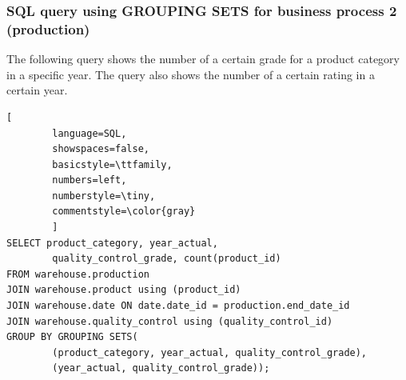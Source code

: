 \documentclass[letterpaper,12pt]{article}
\begin{document}
\subsubsection{SQL query using GROUPING SETS for business process 2 (production)}

The following query shows the number of a certain grade for a product category in a specific year. The query also shows the number of a certain rating in a certain year.

\begin{lstlisting}[
        language=SQL,
        showspaces=false,
        basicstyle=\ttfamily,
        numbers=left,
        numberstyle=\tiny,
        commentstyle=\color{gray}
        ]
SELECT product_category, year_actual, 
        quality_control_grade, count(product_id)
FROM warehouse.production
JOIN warehouse.product using (product_id)
JOIN warehouse.date ON date.date_id = production.end_date_id
JOIN warehouse.quality_control using (quality_control_id)
GROUP BY GROUPING SETS(
        (product_category, year_actual, quality_control_grade),
        (year_actual, quality_control_grade));
\end{lstlisting}
\end{document}
